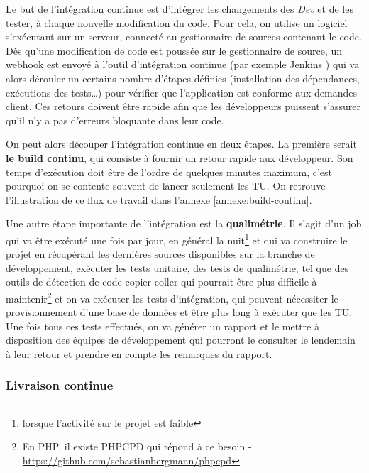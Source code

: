 

Le but de l'intégration continue est d'intégrer les changements des \emph{Dev} et de les tester, à chaque nouvelle modification du code. Pour cela, on utilise un logiciel s'exécutant sur un serveur, connecté au gestionnaire de sources contenant le code. Dès qu'une modification de code est poussée sur le gestionnaire de source, un \gls{webhook} est envoyé à l'outil d'intégration continue (par exemple Jenkins \cite{jenkins-guide}) qui va alors dérouler un certains nombre d'étapes définies (installation des dépendances, exécutions des tests\ldots) pour vérifier que l'application est conforme aux demandes client. Ces retours doivent être rapide afin que les développeurs puissent s'assurer qu'il n'y a pas d'erreurs bloquante dans leur code.

On peut alors découper l'intégration continue en deux étapes. La première serait \textbf{le build continu}, qui consiste à fournir un retour rapide aux développeur. Son temps d'exécution doit être de l'ordre de quelques minutes maximum, c'est pourquoi on se contente souvent de lancer seulement les \gls{TU}. On retrouve l'illustration de ce flux de travail dans l'annexe \ref{annexe:build-continu}.

Une autre étape importante de l'intégration est la \textbf{qualimétrie}. Il s'agit d'un job qui va être exécuté une fois par jour, en général la nuit\footnote{lorsque l'activité sur le projet est faible} et qui va construire le projet en récupérant les dernières sources disponibles sur la branche de développement, exécuter les tests unitaire, des tests de qualimétrie, tel que des outils de détection de code copier coller qui pourrait être plus difficile à maintenir\footnote{En \gls{PHP}, il existe PHPCPD qui répond à ce besoin - \url{https://github.com/sebastianbergmann/phpcpd}} et on va exécuter les tests d'intégration, qui peuvent nécessiter le provisionnement d'une base de données et être plus long à exécuter que les \gls{TU}. Une fois tous ces tests effectués, on va générer un rapport et le mettre à disposition des équipes de développement qui pourront le consulter le lendemain à leur retour et prendre en compte les remarques du rapport.


\subsubsection{Livraison continue}

